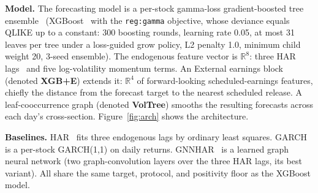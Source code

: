 \documentclass[runningheads]{llncs}
\begin{document}
\textbf{Model.} The forecasting model is a per-stock gamma-loss gradient-boosted tree
ensemble~\cite{friedman2001} (XGBoost~\cite{chen2016} with the \texttt{reg:gamma} objective, whose
deviance equals QLIKE up to a constant: 300 boosting rounds, learning rate 0.05, at most 31 leaves per
tree under a loss-guided grow policy, L2 penalty 1.0, minimum child weight 20, 3-seed ensemble). The endogenous feature vector is $\mathbb{R}^8$: three HAR
lags~\cite{corsi2009} and five log-volatility momentum terms. An External earnings block
(denoted \textbf{XGB+E}) extends it: $\mathbb{R}^4$ of forward-looking scheduled-earnings features,
chiefly the distance from the forecast target to the nearest scheduled release. A leaf-cooccurrence
graph (denoted \textbf{VolTree}) smooths the resulting forecasts across each day's
cross-section. Figure~\ref{fig:arch} shows the architecture.

\textbf{Baselines.} HAR~\cite{corsi2009} fits three endogenous lags by ordinary least squares. GARCH is a per-stock GARCH(1,1) on daily
returns. GNNHAR~\cite{gnnhar2024} is a learned graph neural network (two graph-convolution layers over
the three HAR lags, its best variant). All share the same target, protocol, and positivity floor as
the XGBoost model.
\end{document}
